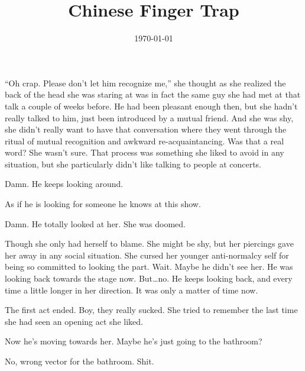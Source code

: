 \documentclass[letterpaper]{article}
\title{Chinese Finger Trap}
\author{}
\date{\today}
\begin{document}
\maketitle

``Oh crap. Please don't let him recognize me,'' she thought as she realized the back of the head she was staring at was in fact the same guy she had met at that talk a couple of weeks before.
He had been pleasant enough then, but she hadn't really talked to him, just been introduced by a mutual friend.
And she was shy, she didn't really want to have that conversation where they went through the ritual of mutual recognition and awkward re-acquaintancing. Was that a real word?
She wasn't sure. That process was something she liked to avoid in any situation, but she particularly didn't like talking to people at concerts.

Damn. He keeps looking around. 

As if he is looking for someone he knows at this show.

Damn. He totally looked at her. She was doomed.

Though she only had herself to blame.
She might be shy, but her piercings gave her away in any social situation.
She cursed her younger anti-normalcy self for being so committed to looking the part.
Wait. Maybe he didn't see her. He was looking back towards the stage now.
But\ldots no. He keeps looking back, and every time a little longer in her direction. It was only a matter of time now.

The first act ended. Boy, they really sucked. She tried to remember the last time she had seen an opening act she liked.

Now he's moving towards her.
Maybe he's just going to the bathroom?

No, wrong vector for the bathroom. Shit.
\end{document}

